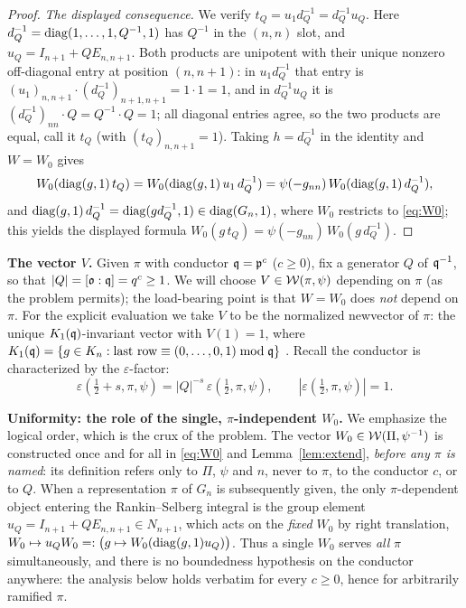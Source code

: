 \begin{proof}
\emph{The displayed consequence.}
We verify $t_Q=u_1 d_Q^{-1}=d_Q^{-1}u_Q$. Here $d_Q^{-1}=\operatorname{diag}(1,\dots,1,Q^{-1},1)$ has
$Q^{-1}$ in the $(n,n)$ slot, and $u_Q=I_{n+1}+QE_{n,n+1}$. Both products are unipotent with their
unique nonzero off-diagonal entry at position $(n,n+1)$: in $u_1 d_Q^{-1}$ that entry is
$(u_1)_{n,n+1}\cdot(d_Q^{-1})_{n+1,n+1}=1\cdot1=1$, and in $d_Q^{-1}u_Q$ it is
$(d_Q^{-1})_{nn}\cdot Q=Q^{-1}\cdot Q=1$; all diagonal entries agree, so the two products are equal,
call it $t_Q$ \textup{(}with $(t_Q)_{n,n+1}=1$\textup{)}. Taking $h=d_Q^{-1}$ in the identity and
$W=W_0$ gives
\[
W_0(\operatorname{diag}(g,1)\,t_Q)=W_0(\operatorname{diag}(g,1)\,u_1\,d_Q^{-1})=\psi(-g_{nn})\,W_0(\operatorname{diag}(g,1)\,d_Q^{-1}),
\]
and $\operatorname{diag}(g,1)\,d_Q^{-1}=\operatorname{diag}(g d_Q^{-1},1)\in\operatorname{diag}(G_n,1)$, where $W_0$ restricts to
\eqref{eq:W0}; this yields the displayed formula
$W_0(g\,t_Q)=\psi(-g_{nn})\,W_0(g\,d_Q^{-1})$.
\end{proof}

\noindent\textbf{The vector $V$.} Given $\pi$ with conductor $\mathfrak{q}=\mathfrak{p}^{c}$
\textup{(}$c\ge0$\textup{)}, fix a generator $Q$ of $\mathfrak{q}^{-1}$, so that
$|Q|=[\mathfrak{o}:\mathfrak{q}]=q^{c}\ge1$. We will choose $V\in\mathcal{W}(\pi,\psi)$ depending on $\pi$
\textup{(}as the problem permits\textup{)}; the load-bearing point is that $W=W_0$ does
\emph{not} depend on $\pi$. For the explicit evaluation we take $V$ to be the normalized
newvector of $\pi$: the unique $K_1(\mathfrak{q})$-invariant vector with $V(1)=1$, where
$K_1(\mathfrak{q})=\{g\in K_n:\text{last row}\equiv(0,\dots,0,1)\bmod\mathfrak{q}\}$
\cite{JPSS81,Matringe}. Recall the conductor is characterized by the $\varepsilon$-factor:
\begin{equation}\label{eq:eps}
\varepsilon(\tfrac12+s,\pi,\psi)=|Q|^{-s}\,\varepsilon(\tfrac12,\pi,\psi),
\qquad |\varepsilon(\tfrac12,\pi,\psi)|=1 .
\end{equation}

\medskip
\noindent\textbf{Uniformity: the role of the single, $\pi$-independent $W_0$.}
We emphasize the logical order, which is the crux of the problem. The vector
$W_0\in\mathcal{W}(\Pi,\psi^{-1})$ is constructed once and for all in \eqref{eq:W0} and
Lemma~\ref{lem:extend}, \emph{before any $\pi$ is named}: its definition refers only to
$\Pi$, $\psi$ and $n$, never to $\pi$, to the conductor $c$, or to $Q$. When a representation
$\pi$ of $G_n$ is subsequently given, the only $\pi$-dependent object entering the
Rankin--Selberg integral is the group element
$u_Q=I_{n+1}+QE_{n,n+1}\in N_{n+1}$, which acts on the \emph{fixed} $W_0$ by right
translation, $W_0\mapsto u_QW_0=:\big(g\mapsto W_0(\operatorname{diag}(g,1)u_Q)\big)$. Thus a single
$W_0$ serves \emph{all} $\pi$ simultaneously, and there is no boundedness hypothesis on the
conductor anywhere: the analysis below holds verbatim for every $c\ge0$, hence for arbitrarily
ramified $\pi$.


